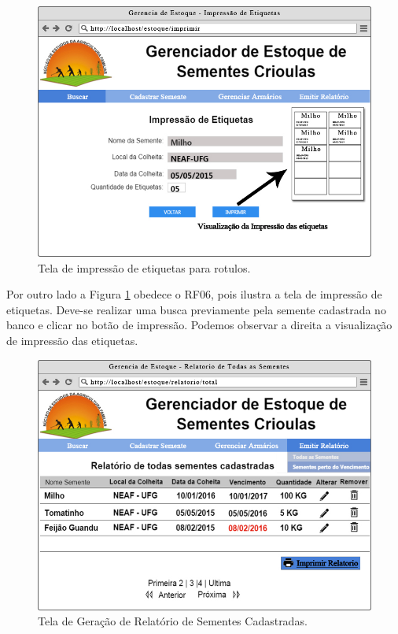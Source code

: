 \documentclass[12pt,a4paper]{article}
\begin{document}
\begin{figure}[H]
\centering %
\includegraphics[width=14cm]{Figuras/imprimir.jpg} %
\caption{Tela de impressão de etiquetas para rotulos.}
\label{figura:Tela_impressao}
\end{figure}

Por outro lado a Figura \ref{figura:Tela_impressao} obedece o RF06, pois ilustra a tela de impressão de etiquetas. Deve-se realizar uma busca previamente pela semente cadastrada no banco e clicar no botão de impressão. Podemos observar a direita a visualização de impressão das etiquetas.


\begin{figure}[H]
\centering %
\includegraphics[width=14cm]{Figuras/relatorio_total.jpg} %
\caption{Tela de Geração de Relatório de Sementes Cadastradas.}
\label{figura:Tela_relatorio_total}
\end{figure}
\end{document}
